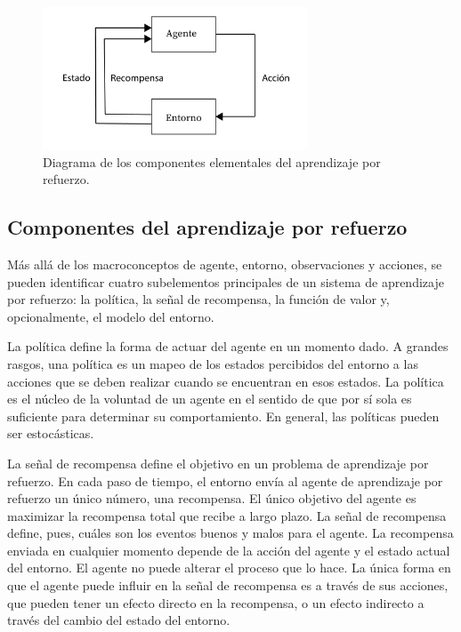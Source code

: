 \begin{figure}[ht!]
    \centering
    \includegraphics[width=0.7\textwidth]{Graphics/rl-elements.png}
    \caption{Diagrama de los componentes elementales del aprendizaje por refuerzo.}
    \label{fig:rl-elements}
\end{figure}

\subsection{Componentes del aprendizaje por refuerzo}

Más allá de los macroconceptos de agente, entorno, observaciones y acciones, se pueden identificar cuatro subelementos principales de un sistema de aprendizaje por refuerzo: la política, la señal de recompensa, la función de valor y, opcionalmente, el modelo del entorno.

La política define la forma de actuar del agente en un momento dado. A grandes rasgos, una política es un mapeo de los estados percibidos del entorno a las acciones que se deben realizar cuando se encuentran en esos estados. La política es el núcleo de la voluntad de un agente en el sentido de que por sí sola es suficiente para determinar su comportamiento. En general, las políticas pueden ser estocásticas.

La señal de recompensa define el objetivo en un problema de aprendizaje por refuerzo. En cada paso de tiempo, el entorno envía al agente de aprendizaje por refuerzo un único número, una recompensa. El único objetivo del agente es maximizar la recompensa total que recibe a largo plazo. La señal de recompensa define, pues, cuáles son los eventos buenos y malos para el agente. La recompensa enviada en cualquier momento depende de la acción del agente y el estado actual del entorno. El agente no puede alterar el proceso que lo hace. La única forma en que el agente puede influir en la señal de recompensa es a través de sus acciones, que pueden tener un efecto directo en la recompensa, o un efecto indirecto a través del cambio del estado del entorno.

